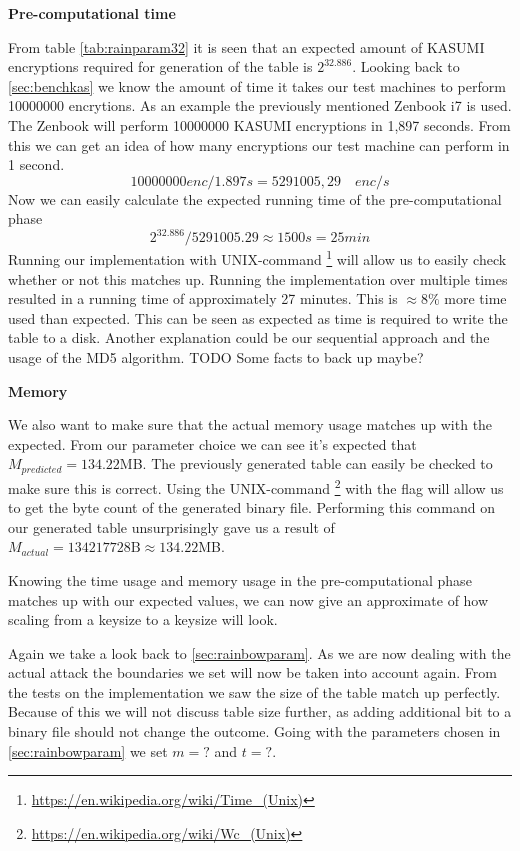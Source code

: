 \textbf{Pre-computational time}

From table \ref{tab:rainparam32} it is seen that an expected amount of
KASUMI encryptions required for generation of the table is
$2^{32.886}$. Looking back to \ref{sec:benchkas} we know the
amount of time it takes our test machines to perform 10000000 encrytions. As an
example the previously mentioned Zenbook i7 is used. The
Zenbook will perform 10000000 KASUMI encryptions in 1,897
seconds. From this we can get an idea of how many encryptions our test
machine can perform in 1 second.
\[10000000 enc / 1.897 s = 5291005,29 \quad enc/s\]
Now we can easily calculate the expected running time of the
pre-computational phase 
\[2^{32.886} / 5291005.29 \approx 1500s = 25 min \]
Running our implementation with UNIX-command
\footnote{\url{https://en.wikipedia.org/wiki/Time_(Unix)}} will
allow us to easily check whether or not this matches up. Running the
implementation over multiple times resulted in a running time of
approximately 27 minutes. This is $\approx8\%$ more time used than
expected. This can be seen as expected as time is required to write
the table to a disk. Another explanation could be our sequential
approach and the usage of the MD5 algorithm. TODO Some facts to back up maybe?

\textbf{Memory}

We also want to make sure that the actual memory usage matches up with
the expected. From our parameter choice we can see it's expected
that $M_{predicted}=134.22$MB. The previously generated table can easily be
checked to make sure this is correct. Using the UNIX-command
\footnote{\url{https://en.wikipedia.org/wiki/Wc_(Unix)}} with
the  flag will allow us to get the byte count of the
generated binary file. Performing this command on our generated table
unsurprisingly gave us a result of
$M_{actual}=134217728\text{B}\approx134.22$MB.

Knowing the time usage and memory usage in the pre-computational phase
matches up with our expected values, we can now give an approximate of
how scaling from a  keysize to a  keysize
will look.

Again we take a look back to \ref{sec:rainbowparam}. As we are now
dealing with the actual  attack the boundaries we set
will now be taken into account again. From the tests on the
 implementation we saw the size of the table match up
perfectly. Because of this we will not discuss table size further, as
adding additional bit to a binary file should not change the outcome. 
Going with the parameters chosen in \ref{sec:rainbowparam} we set
$m=?$ and $t=?$. 

